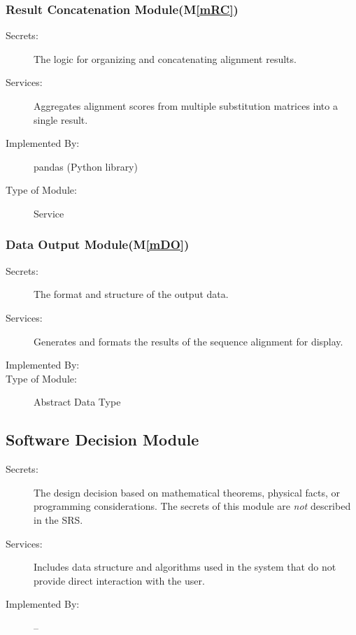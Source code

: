 \documentclass[12pt, titlepage]{article}
\newcommand{\mref}[1]{M\ref{#1}}
\begin{document}
\subsubsection{Result Concatenation Module(\mref{mRC})}

\begin{description}
  \item[Secrets:] The logic for organizing and concatenating alignment results.
  \item[Services:] Aggregates alignment scores from multiple substitution matrices into a single result.
  \item[Implemented By:] pandas (Python library)
  \item[Type of Module:] Service
\end{description}

\subsubsection{Data Output Module(\mref{mDO})}

\begin{description}
  \item[Secrets:] The format and structure of the output data.
  \item[Services:] Generates and formats the results of the sequence alignment for display.
  \item[Implemented By:] \progname{}
  \item[Type of Module:] Abstract Data Type
\end{description}


\subsection{Software Decision Module}

\begin{description}
\item[Secrets:] The design decision based on mathematical theorems, physical
  facts, or programming considerations. The secrets of this module are
  \emph{not} described in the SRS.
\item[Services:] Includes data structure and algorithms used in the system that
  do not provide direct interaction with the user. 
\item[Implemented By:] --
\end{description}
\end{document}
